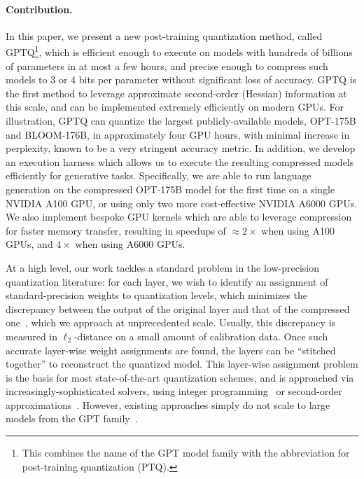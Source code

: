 \paragraph{Contribution.} In this paper, we present a new post-training quantization method, called GPTQ\footnote{This combines the name of the GPT model family with the abbreviation for post-training quantization (PTQ).}, which is efficient enough to execute on models with hundreds of billions of parameters in at most a few hours, 
and precise enough to compress such models to 3 or 4 bits per parameter without significant loss of accuracy. 
GPTQ is the first method to leverage approximate second-order (Hessian) information at this scale, and can be implemented extremely efficiently on modern GPUs. 
For illustration, GPTQ can quantize the largest publicly-available models, OPT-175B and BLOOM-176B, in approximately four GPU hours, with minimal increase in perplexity, known to be a very stringent accuracy metric. In addition, we develop an execution harness which allows us to execute the resulting compressed models efficiently for generative tasks. 
Specifically, we are able to run language generation on the compressed OPT-175B model for the first time on a single NVIDIA A100 GPU, or using only two more cost-effective NVIDIA A6000 GPUs. We also implement bespoke GPU kernels which are able to leverage compression for faster memory transfer, 
resulting in speedups of $\approx 2 \times$ when using A100 GPUs, and $4\times$ when using A6000 GPUs.

At a high level, our work tackles a standard problem in the low-precision quantization literature:  
for each layer, we wish to identify an assignment of standard-precision weights to quantization levels, which minimizes the discrepancy between the output of the original layer and that of the compressed one~\cite{nagel2020up, li2021brecq, hubara2021accurate, yao2022zeroquant, frantar2022obc}, which we approach at unprecedented scale. Usually, this discrepancy is measured in $\ell_2$-distance on a small amount of calibration data. 
Once such accurate layer-wise weight assignments are found, the layers can be ``stitched together'' to reconstruct the quantized model. 
This layer-wise assignment problem is the basis for most state-of-the-art quantization schemes, and is approached via increasingly-sophisticated solvers, using integer programming~\cite{hubara2020improving} or second-order approximations~\cite{li2021brecq, frantar2022obc}. However, existing approaches simply do not scale to large models from the GPT family~\cite{yao2022zeroquant}.

